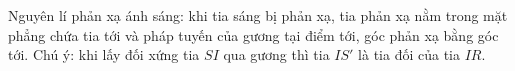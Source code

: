 \begin{ex}
Nguyên lí phản xạ ánh sáng: khi tia sáng bị phản xạ, tia phản xạ nằm trong mặt phẳng chứa tia tới và pháp tuyến của gương tại điểm tới, góc phản xạ bằng góc tới. Chú ý: khi lấy đối xứng tia $SI$ qua gương thì tia $IS'$ là tia đối của tia $IR$.


\end{ex}
